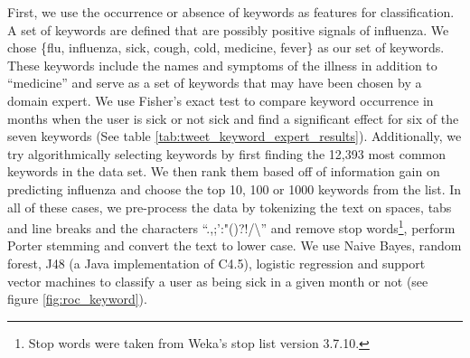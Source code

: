 \documentclass{acm_proc_article-sp}
\begin{document}
First, we use the occurrence or absence of keywords as features for classification. A set of keywords are defined that are possibly positive signals of influenza. We chose \{flu, influenza, sick, cough, cold, medicine, fever\} as our set of keywords. These keywords include the names and symptoms of the illness in addition to ``medicine'' and serve as a set of keywords that may have been chosen by a domain expert. We use Fisher's exact test to compare keyword occurrence in months when the user is sick or not sick and find a significant effect for six of the seven keywords (See table \ref{tab:tweet_keyword_expert_results}). Additionally, we try algorithmically selecting keywords by first finding the 12,393 most common keywords in the data set.  We then rank them based off of information gain on predicting influenza and choose the top 10, 100 or 1000 keywords from the list. In all of these cases, we pre-process the data by tokenizing the text on spaces, tabs and line breaks and the characters ``.,;':"()?!/\textbackslash '' and remove stop words\footnote{Stop words were taken from Weka's stop list version 3.7.10.}, perform Porter stemming \cite{Porter:1980dd}  and convert the text to lower case. We use Naive Bayes, random forest, J48 (a Java implementation of C4.5), logistic regression and support vector machines to classify a user as being sick in a given month or not (see figure \ref{fig:roc_keyword}).
\end{document}
